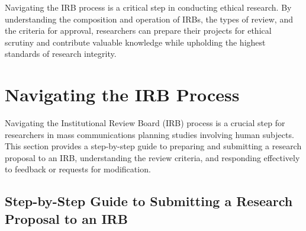 \documentclass[
]{book}
\begin{document}
Navigating the IRB process is a critical step in conducting ethical research. By understanding the composition and operation of IRBs, the types of review, and the criteria for approval, researchers can prepare their projects for ethical scrutiny and contribute valuable knowledge while upholding the highest standards of research integrity.

\hypertarget{navigating-the-irb-process}{%
\section{Navigating the IRB Process}\label{navigating-the-irb-process}}

Navigating the Institutional Review Board (IRB) process is a crucial step for researchers in mass communications planning studies involving human subjects. This section provides a step-by-step guide to preparing and submitting a research proposal to an IRB, understanding the review criteria, and responding effectively to feedback or requests for modification.

\hypertarget{step-by-step-guide-to-submitting-a-research-proposal-to-an-irb}{%
\subsection*{Step-by-Step Guide to Submitting a Research Proposal to an IRB}\label{step-by-step-guide-to-submitting-a-research-proposal-to-an-irb}}
\end{document}
